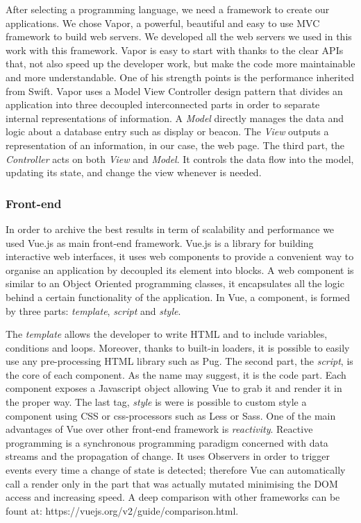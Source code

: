 \documentclass[]{usiinfbachelorproject}
\begin{document}
After selecting a programming language, we need a framework to create our applications. We chose Vapor, a powerful, beautiful and easy to use MVC framework to build web servers. We developed all the web servers we used in this work with this framework.
Vapor is easy to start with thanks to the clear APIs that, not also speed up the developer work, but make the code more maintainable and more understandable. One of his strength points is the performance inherited from Swift.
Vapor uses a Model View Controller design pattern that divides an application into three decoupled interconnected parts in order to separate internal representations of information. A \emph{Model} directly manages the data and logic about a database entry such as display or beacon. The \emph{View} outputs a representation of an information, in our case, the web page. The third part, the \emph{Controller} acts on both \emph{View} and \emph{Model}. It controls the data flow into the model, updating its state, and change the view whenever is needed.
\subsubsection{Front-end}
In order to archive the best results in term of scalability and performance we used Vue.js as main front-end framework. Vue.js is a library for building interactive web interfaces, it uses web components to provide a convenient way to organise an application by decoupled its element into blocks.
A web component is similar to an Object Oriented programming classes, it encapsulates all the logic behind a certain functionality of the application. In Vue, a component, is formed by three parts: \emph{template}, \emph{script} and \emph{style}.

The \emph{template} allows the developer to write HTML and to include variables, conditions and loops. Moreover, thanks to built-in loaders, it is possible to easily use any pre-processing HTML library such as Pug. 
The second part, the \emph{script}, is the core of each component. As the name may suggest, it is the code part. Each component exposes a Javascript object allowing Vue to grab it and render it in the proper way.
The last tag, \emph{style} is were is possible to custom style a component using CSS or css-processors such as  Less or Sass.
One of the main advantages of Vue over other front-end framework is \emph{reactivity}. Reactive programming is a synchronous programming paradigm concerned with data streams and the propagation of change. It uses Observers in order to trigger events every time a change of state is detected; therefore Vue can automatically call a render only in the part that was actually mutated minimising the DOM access and increasing speed.
A deep comparison with other frameworks can be fount at: https://vuejs.org/v2/guide/comparison.html.
\end{document}
